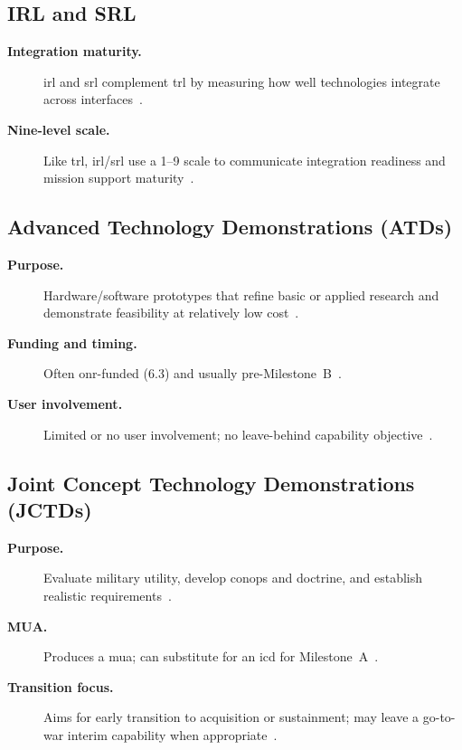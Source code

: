 \documentclass[../main.tex]{subfiles}
\begin{document}
\subsection{IRL and SRL}
\begin{description}
  \item[\textbf{Integration maturity.}] \ac{irl} and \ac{srl} complement \ac{trl} by measuring how well technologies integrate across interfaces~\autocite{edo-3-3-4-research-development-2025,USDRE-TRA-2025}.
  \item[\textbf{Nine-level scale.}] Like \ac{trl}, \ac{irl}/\ac{srl} use a 1--9 scale to communicate integration readiness and mission support maturity~\autocite{edo-3-3-4-research-development-2025,USDRE-TRA-2025}.
\end{description}

\subsection{Advanced Technology Demonstrations (ATDs)}
\begin{description}
  \item[\textbf{Purpose.}] Hardware/software prototypes that refine basic or applied research and demonstrate feasibility at relatively low cost~\autocite{edo-3-3-4-research-development-2025}.
  \item[\textbf{Funding and timing.}] Often \ac{onr}-funded (6.3) and usually pre-Milestone~B~\autocite{edo-3-3-4-research-development-2025,DoDFMR-Vol2B-Ch5}.
  \item[\textbf{User involvement.}] Limited or no user involvement; no leave-behind capability objective~\autocite{edo-3-3-4-research-development-2025}.
\end{description}

\subsection{Joint Concept Technology Demonstrations (JCTDs)}
\begin{description}
  \item[\textbf{Purpose.}] Evaluate military utility, develop \ac{conops} and doctrine, and establish realistic requirements~\autocite{edo-3-3-4-research-development-2025}.
  \item[\textbf{MUA.}] Produces a \ac{mua}; can substitute for an \ac{icd} for Milestone~A~\autocite{edo-3-3-4-research-development-2025}.
  \item[\textbf{Transition focus.}] Aims for early transition to acquisition or sustainment; may leave a go-to-war interim capability when appropriate~\autocite{edo-3-3-4-research-development-2025}.
\end{description}
\end{document}

